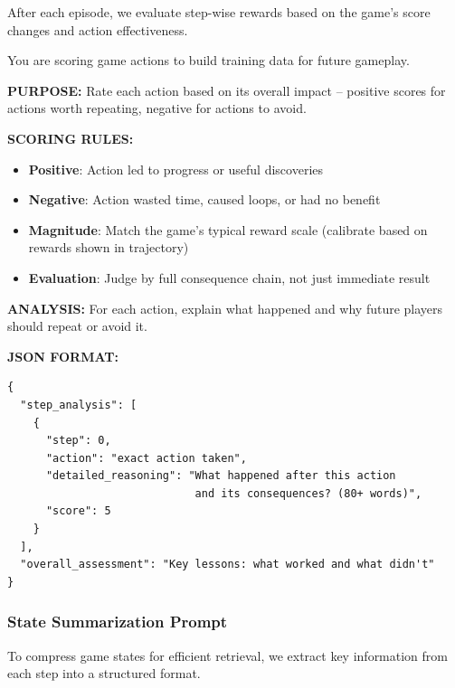 After each episode, we evaluate step-wise rewards based on the game's score changes and action effectiveness.

\begin{promptbox}[title=Jericho Step-wise Reward Evaluation Prompt]
\small
You are scoring game actions to build training data for future gameplay.

\textbf{PURPOSE:} Rate each action based on its overall impact -- positive scores for actions worth repeating, negative for actions to avoid.

\textbf{SCORING RULES:}
\begin{itemize}[leftmargin=*,nosep]
    \item \textbf{Positive}: Action led to progress or useful discoveries
    \item \textbf{Negative}: Action wasted time, caused loops, or had no benefit
    \item \textbf{Magnitude}: Match the game's typical reward scale (calibrate based on rewards shown in trajectory)
    \item \textbf{Evaluation}: Judge by full consequence chain, not just immediate result
\end{itemize}

\textbf{ANALYSIS:} For each action, explain what happened and why future players should repeat or avoid it.

\textbf{JSON FORMAT:}
\begin{verbatim}
{
  "step_analysis": [
    {
      "step": 0,
      "action": "exact action taken",
      "detailed_reasoning": "What happened after this action
                             and its consequences? (80+ words)",
      "score": 5
    }
  ],
  "overall_assessment": "Key lessons: what worked and what didn't"
}
\end{verbatim}
\end{promptbox}

\subsubsection{State Summarization Prompt}

To compress game states for efficient retrieval, we extract key information from each step into a structured format.

